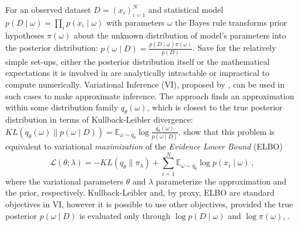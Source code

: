 \documentclass[a4paper,10pt,twocolumn]{article}
\begin{document}
For an observed dataset $
  D = (x_i)_{i=1}^N
$ and statistical model $
  p(D \mid \omega)
    = \prod_i p(x_i \mid \omega)
$ with parameters $\omega$ the Bayes rule transforms prior hypotheses $\pi(\omega)$
about the unknown distribution of model's parameters into the posterior distribution: $
  p(\omega \mid D) = \tfrac{p(D \mid \omega) \pi(\omega)}{p(D)}
$.
%
Save for the relatively simple set-ups, either the posterior distribution itself or the
mathematical expectations it is involved in are analytically intractable or impractical
to compute numerically. Variational Inference (VI), proposed by \citet{jordan_introduction_1999},
can be used in such cases to make approximate inference. The approach finds an approximation
within some distribution family $q_\theta(\omega)$, which is closest to the true posterior
distribution in terms of Kullback-Leibler divergence: $
  KL(q_\theta(\omega) \| p(\omega \mid D))
    = \mathbb{E}_{\omega \sim q_\theta}
      \log \tfrac{q_\theta(\omega)}{p(\omega \mid D)}
$. %
%
\citet{jordan_introduction_1999} show that this problem is equivalent to variational
\emph{maximization} of the \emph{Evidence Lower Bound} (ELBO)
\begin{equation}  \label{eq:elbo_general}
  \mathcal{L}(\theta; \lambda)
    = - KL(q_{\theta} \| \pi_{\lambda})
      + \sum_{i=1}^N \mathbb{E}_{\omega \sim q_{\theta}}
        \log p(x_i \mid \omega)
  \,,
\end{equation}
where the variational parameters $\theta$ and $\lambda$ parameterize the approximation
and the prior, respectively.
%
Kullback-Leibler and, by proxy, ELBO are standard objectives in VI, however it is possible
to use other objectives, provided the true posterior $p(\omega \mid D)$ is evaluated only
through $\log p(D \mid \omega)$ and $\log \pi(\omega)$, \citep{ranganath_operator_2016}.
\end{document}
